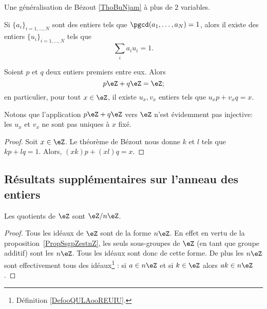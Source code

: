 Une généralisation de Bézout \ref{ThoBuNjam} à plus de \( 2\) variables.
\begin{proposition}     \label{PROPooWSMTooMdfqse}
	Si \( \{ a_i \}_{i=1,\ldots, N}\) sont des entiers tels que \( \pgcd(a_1,\ldots, a_N)=1\), alors il existe des entiers \( \{ u_i \}_{i=1,\ldots, N}\) tels que
	\begin{equation}
		\sum_ia_iu_i=1.
	\end{equation}
\end{proposition}

\begin{corollary}       \label{CorgEMtLj}
	Soient \( p\) et \( q\) deux entiers premiers entre eux. Alors
	\begin{equation}
		p\eZ+q\eZ=\eZ;
	\end{equation}
	en particulier, pour tout \( x \in \eZ \), il existe \( u_x, v_x \) entiers tels que \(u_x p + v_x q = x \).
\end{corollary}

Notons que l'application \( p\eZ+q\eZ\) vers \( \eZ\) n'est évidemment pas injective: les \( u_x\) et \( v_x\) ne sont pas uniques à \( x\) fixé.

\begin{proof}
	Soit \( x\in \eZ\). Le théorème de Bézout nous donne \( k\) et \( l\) tels que \( kp+lq=1\). Alors, \( (xk)p+(xl)q=x\).
\end{proof}

\subsection{Résultats supplémentaires sur l'anneau des entiers}
\begin{corollary}       \label{CORooLINXooBlUKPG}
	Les quotients de \( \eZ\) sont \( \eZ/n\eZ\).
\end{corollary}

\begin{proof}
	Tous les idéaux de \( \eZ\) sont de la forme \( n\eZ\). En effet en vertu de la proposition~\ref{PropSsgpZestnZ}, les seuls sous-groupes de \( \eZ\) (en tant que groupe additif) sont les \( n\eZ\). Tous les idéaux sont donc de cette forme. De plus les \( n\eZ\) sont effectivement tous des idéaux\footnote{Définition \ref{DefooQULAooREUIU}.} : si \( a\in n\eZ\) et si \( k\in \eZ\) alors \( ak\in n\eZ\).
\end{proof}

